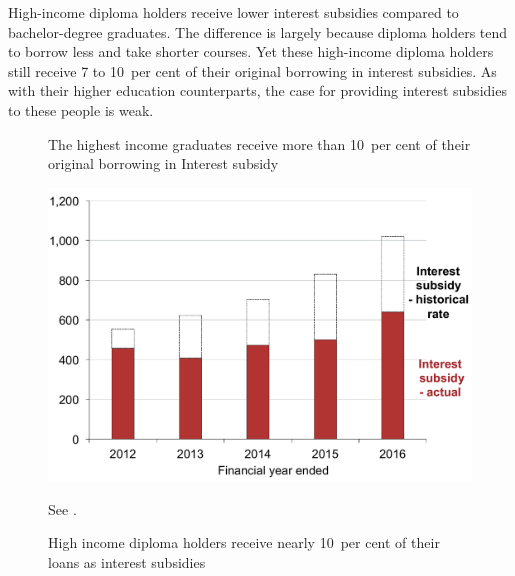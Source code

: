 \documentclass[embargoed]{grattan}
\begin{document}
High-income diploma holders receive lower interest subsidies compared to bachelor-degree graduates.
The difference is largely because diploma holders tend to borrow less and take shorter courses.
Yet these high-income diploma holders still receive 7 to 10~per cent of their original borrowing in interest subsidies.
As with their higher education counterparts, the case for providing interest subsidies to these people is weak.


\begin{figure}
\begin{minipage}[t][\textheight]{\columnwidth}
\vspace{\grattanfptop}
\caption{The highest income graduates receive more than 10~per cent of their original borrowing in \gls{Interest subsidy}}\label{fig:fig10-highest-income-grads-receive-over-10pc-original-borrowing-interest-subsidy}

\includegraphics[page=10]{atlas/Chartpack.pdf}

%
{{See .}}
\end{minipage}
\hfill 
\begin{minipage}[t][\textheight]{\columnwidth}
\vspace{\grattanfptop}
\caption{High income diploma holders receive nearly 10~per cent of their loans as interest subsidies}\label{fig:fig11-high-income-dip-holders-receive-nearly-10pc-loans-as-interest-subsides}


\end{minipage}
\end{figure}
\end{document}
